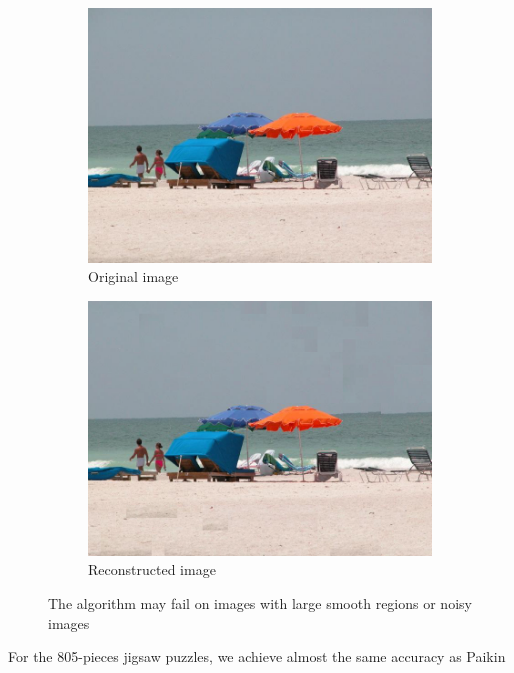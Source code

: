 \documentclass[]{report}
\begin{document}
\begin{figure}
  \centering
  \begin{subfigure}{0.45\textwidth}
    \includegraphics[width=\textwidth]{../imData/540/8.jpg}
		\caption{Original image}
		\label{img:540_8}
	\end{subfigure}
  \begin{subfigure}{0.45\textwidth}
  \includegraphics[width=\textwidth]{8_solved.png}
		\caption{Reconstructed image}
		\label{img:540_8_reconstructed}
	\end{subfigure}
  \caption{The algorithm may fail on images with large smooth regions or noisy images}
  \label{fig:fail}
\end{figure}
For the 805-pieces jigsaw puzzles, we achieve almost the same accuracy as Paikin
\end{document}
